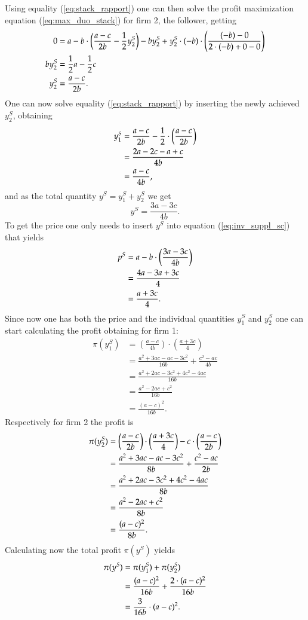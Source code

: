 \documentclass[12pt]{article}
\numberwithin{equation}{subsection}
\begin{document}
Using equality (\ref{eq:stack_rapport}) one can then solve the profit maximization equation (\ref{eq:max_duo_stack}) for firm 2, the follower, getting \begin{align}
0 &= a - b \cdot \left(\frac{a - c}{2b} - \frac{1}{2}y^S_2 \right) - by^S_2  + y^S_2 \cdot (-b) \cdot \left(\frac{(-b) - 0}{2 \cdot (-b) + 0 - 0}\right)\notag \\
by^S_2 & = \frac{1}{2} a - \frac{1}{2}c \notag \\
y^S_2 & = \frac{a - c}{2b}.
\end{align}
One can now solve equality (\ref{eq:stack_rapport}) by inserting the newly achieved $y^S_2$, obtaining \begin{align}
\label{eq:y_1_stack}
y^S_1 &= \frac{a - c}{2b} - \frac{1}{2} \cdot \left(\frac{a - c}{2b}\right)\notag \\
& = \frac{2a - 2c - a + c}{4b} \notag \\
& = \frac{a - c}{4b},
\end{align}
and as the total quantity $y^S = y^S_1 + y^S_2$ we get \begin{equation*}
y^S = \frac{3a - 3c}{4b}.
\end{equation*}
To get the price one only needs to insert $y^S$ into equation (\ref{eq:inv_suppl_sc}) that yields \begin{align}
p^S & = a - b \cdot \left(\frac{3a - 3c}{4b}\right)\notag \\
& = \frac{4a - 3a + 3c}{4} \notag \\
& = 	\frac{a + 3c}{4}.
\end{align}
Since now one has both the price and the individual quantities $y^S_1$ and $y^S_2$ one can start calculating the profit obtaining for firm 1: \begin{align*}
\pi(y^S_1) &= \left(\frac{a - c}{4b}\right) \cdot \left(\frac{a + 3c}{4}\right)\\
& = \frac{a^2 + 3ac - ac - 3c^2}{16b} + \frac{c^2 - ac}{4b}\\
& = \frac{a^2 + 2ac - 3c^2 + 4c^2 - 4ac}{16b}\\
& = \frac{a^2 - 2ac + c^2}{16b}\\
& = \frac{(a-c)^2}{16b}.
\end{align*}
Respectively for firm 2 the profit is \begin{align}
\label{eq:y^S_2}
\pi(y^S_2) &= \left(\frac{a - c }{2b}\right) \cdot \left(\frac{a + 3c}{4}\right) - c \cdot \left(\frac{a - c}{2b}\right) \notag \\
& = \frac{a^2 + 3ac - ac - 3c^2}{8b} + \frac{c^2 - ac}{2b}\notag \\
& = \frac{a^2 + 2ac - 3c^2 + 4c^2 - 4ac}{8b}\notag \\
& = \frac{a^2-2ac+c^2}{8b} \notag \\
& = \frac{(a-c)^2}{8b}.
\end{align}
Calculating now the total profit $\pi(y^S)$ yields \begin{align}
\label{eq:profit_stack}
\pi(y^S) &= \pi(y^S_1) + \pi(y^S_2) \notag \\
& = \frac{(a-c)^2}{16b} + \frac{2 \cdot (a-c)^2}{16b} \notag \\
& = \frac{3}{16b} \cdot (a - c)^2.
\end{align}
\end{document}
